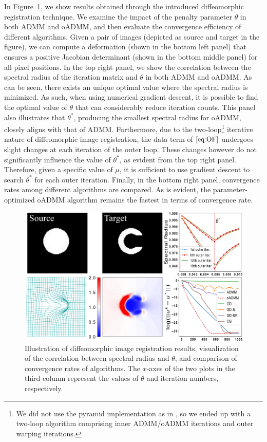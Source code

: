 \documentclass[letterpaper]{article} %
\begin{document}
In Figure~\ref{fig:4}, we show results obtained through the introduced diffeomorphic registration technique. We examine the impact of the penalty parameter $\theta$ in both ADMM and oADMM, and then evaluate the convergence efficiency of different algorithms. Given a pair of images (depicted as source and target in the figure), we can compute a deformation (shown in the bottom left panel) that ensures a positive Jacobian determinant (shown in the bottom middle panel) for all pixel positions. In the top right panel, we show the correlation between the spectral radius of the iteration matrix and $\theta$ in both ADMM and oADMM. As can be seen, there exists an unique optimal value where the spectral radius is minimized. As such, when using numerical gradient descent, it is possible to find the optimal value of $\theta$ that can considerably reduce iteration counts. This panel also illustrates that $\theta^*$, producing the smallest spectral radius for oADMM, closely aligns with that of ADMM. Furthermore, due to the two-loop\footnote{We did not use the pyramid implementation as in \cite{thorley2021nesterov}, so we ended up with a two-loop algorithm comprising inner ADMM/oADMM iterations and outer warping iterations.} iterative nature of diffeomorphic image registration, the data term of $\eqref{eq:OF}$ undergoes slight changes at each iteration of the outer loop. These changes however do not significantly influence the value of $\theta^*$, as evident from the top right panel. Therefore, given a specific value of $\mu$, it is sufficient to use gradient descent to search $\theta^*$ for each outer iteration. Finally, in the bottom right panel, convergence rates among different algorithms are compared. As is evident, the parameter-optimized oADMM algorithm remains the fastest in terms of convergence rate.
\begin{figure}[t]
	\centering
   \includegraphics[width=0.98\linewidth]{Figures/n13.pdf}
	\vspace{-5pt}
	\caption{ Illustration of diffeomorphic image registration results, visualization of the correlation between spectral radius and $\theta$, and comparison of convergence rates of algorithms. The $x$-axes of the two plots in the third column represent the values of $\theta$ and iteration numbers, respectively.}
	\label{fig:4}
 \vspace{-10pt}
\end{figure}
\end{document}
